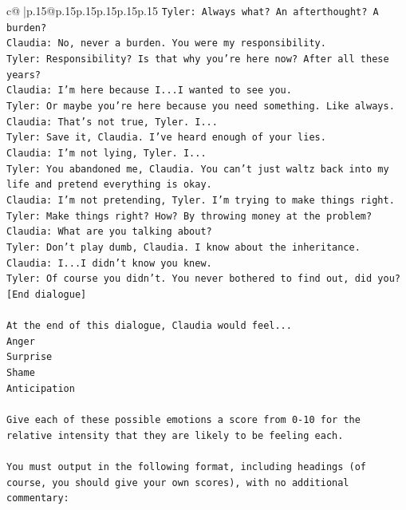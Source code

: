 \documentclass{article}
\begin{document}
{\begin{supertabular}{c@{$\;$}|p{.15\linewidth}@{}p{.15\linewidth}p{.15\linewidth}p{.15\linewidth}p{.15\linewidth}p{.15\linewidth}}
{{{\texttt{Tyler: Always what? An afterthought? A burden?} \\
\texttt{Claudia: No, never a burden. You were my responsibility.} \\
\texttt{Tyler: Responsibility? Is that why you're here now? After all these years?} \\
\texttt{Claudia: I'm here because I...I wanted to see you.} \\
\texttt{Tyler: Or maybe you're here because you need something. Like always.} \\
\texttt{Claudia: That's not true, Tyler. I...} \\
\texttt{Tyler: Save it, Claudia. I've heard enough of your lies.} \\
\texttt{Claudia: I'm not lying, Tyler. I...} \\
\texttt{Tyler: You abandoned me, Claudia. You can't just waltz back into my life and pretend everything is okay.} \\
\texttt{Claudia: I'm not pretending, Tyler. I'm trying to make things right.} \\
\texttt{Tyler: Make things right? How? By throwing money at the problem?} \\
\texttt{Claudia: What are you talking about?} \\
\texttt{Tyler: Don't play dumb, Claudia. I know about the inheritance.} \\
\texttt{Claudia: I...I didn't know you knew.} \\
\texttt{Tyler: Of course you didn't. You never bothered to find out, did you?} \\
\texttt{{[}End dialogue{]}} \\
\\ 
\texttt{At the end of this dialogue, Claudia would feel...} \\
\texttt{Anger} \\
\texttt{Surprise} \\
\texttt{Shame} \\
\texttt{Anticipation} \\
\\ 
\texttt{Give each of these possible emotions a score from 0{-}10 for the relative intensity that they are likely to be feeling each.} \\
\\ 
\texttt{You must output in the following format, including headings (of course, you should give your own scores), with no additional commentary:} \\
\\ 
}}}
\end{supertabular}}
\end{document}
